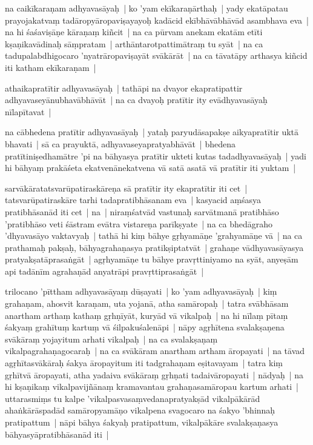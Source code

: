 \documentclass[article,12pt,a4paper]{memoir}
\newcommand{\persName}[1]{#1}
\begin{document}
	  \pstart na caikīkaraṇam adhyavasāyaḥ | ko 'yam ekīkaraṇārthaḥ | yady ekatāpatau prayojakatvaṃ tadāropyāropaviṣayayoḥ kadācid ekībhāvābhāvād asambhava eva | na hi śaśaviṣāṇe kāraṇaṃ kiñcit | na ca pūrvam anekam ekatām etīti kṣaṇikavādinaḥ sāṃpratam | arthāntarotpattimātraṃ tu syāt | na ca tadupalabdhigocaro 'nyatrāropaviṣayāt svākārāt | na ca tāvatāpy arthasya kiñcid iti katham ekīkaraṇam |
	\pend
      

	  \pstart athaikapratītir adhyavasāyaḥ | tathāpi na dvayor ekapratipattir adhyavaseyānubhavābhāvāt | na ca dvayoḥ pratītir ity evādhyavasāyaḥ nīlapītavat | \label{thakur75-134.27}
	\pend
      

	  \pstart na cābhedena pratītir adhyavasāyaḥ | yataḥ paryudāsapakṣe aikyapratītir uktā bhavati | sā ca prayuktā, adhyavaseyapratyabhāvāt | bhedena pratītiniṣedhamātre 'pi na bāhyasya pratītir ukteti kutas tadadhyavasāyaḥ | yadi hi bāhyaṃ prakāśeta ekatvenānekatvena vā satā asatā vā pratītir iti yuktam | 
	\pend
      

	  \pstart sarvākāratatsvarūpatiraskāreṇa sā pratītir ity ekapratītir iti cet | tatsvarūpatiraskāre tarhi tadapratibhāsanam eva | kasyacid aṃśasya pratibhāsanād iti cet | na | niraṃśatvād vastunaḥ sarvātmanā pratibhāso 'pratibhāso veti śāstram evātra vistareṇa parīkṣyate | \label{thakur75-135.1} na ca bhedāgraho 'dhyavasāyo vaktavyaḥ | tathā hi kiṃ bāhye gṛhyamāṇe 'grahyamāṇe vā | na ca prathamaḥ pakṣaḥ, bāhyagrahaṇasya pratikṣiptatvāt | grahaṇe vādhyavasāyasya pratyakṣatāprasaṅgāt | agṛhyamāṇe tu bāhye pravṛttiniyamo na syāt, anyeṣām api tadānīm agrahaṇād anyatrāpi pravṛttiprasaṅgāt |
	\pend
      

	  \pstart \persName{trilocano} 'pīttham adhyavasāyaṃ dūṣayati | ko 'yam adhyavasāyaḥ | kiṃ grahaṇam, ahosvit karaṇam, uta yojanā, atha samāropaḥ | tatra svābhāsam anartham arthaṃ kathaṃ gṛhṇīyāt, kuryād vā vikalpaḥ | na hi nīlaṃ pītaṃ śakyaṃ grahītuṃ kartuṃ vā śilpakuśalenāpi | nāpy agṛhītena svalakṣaṇena svākāraṃ yojayitum arhati vikalpaḥ | na ca svalakṣaṇaṃ vikalpagrahaṇagocaraḥ | na ca svākāram anartham artham āropayati | na tāvad agṛhītasvākāraḥ śakya āropayitum iti tadgrahaṇam eṣitavayam | tatra kiṃ gṛhītvā āropayati, atha yadaiva svākāraṃ gṛhṇati tadaivāropayati | nādyaḥ | na hi kṣaṇikaṃ vikalpavijñānaṃ kramavantau grahaṇasamāropau kartum arhati | uttarasmiṃs tu kalpe 'vikalpasvasaṃvedanapratyakṣād vikalpākārād ahaṅkārāspadād  samāropyamāṇo vikalpena svagocaro na śakyo 'bhinnaḥ pratipattum | nāpi bāhya śakyaḥ pratipattum, vikalpākāre svalakṣaṇasya bāhyasyāpratibhāsanād iti |
	\pend
      
\end{document}
